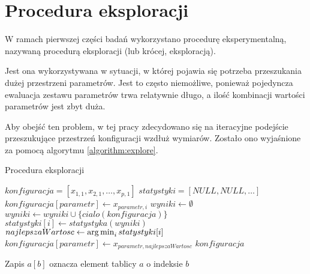 \documentclass[./FM_mgr.tex]{subfiles}
\begin{document}
\section{Procedura eksploracji} \label{appendix:explore}

W ramach pierwszej części badań wykorzystano procedurę eksperymentalną, nazywaną procedurą eksploracji (lub krócej, eksploracją).

Jest ona wykorzystywana w sytuacji, w której pojawia się potrzeba przeszukania dużej przestrzeni parametrów.
Jest to często niemożliwe, ponieważ pojedyncza ewaluacja zestawu parametrów trwa relatywnie długo, a ilość kombinacji wartości parametrów jest zbyt duża.

Aby obejść ten problem, w tej pracy zdecydowano się na iteracyjne podejście przeszukujące przestrzeń konfiguracji wzdłuż wymiarów.
Zostało ono wyjaśnione za pomocą algorytmu \ref{algorithm:explore}.

\clearpage

\begin{algorithm}[H]
	\caption{Procedura eksploracji \label{algorithm:explore}}
	\begin{algorithmic}[1]
		\Start
		\Var $konfiguracja = [x_{1, 1}, x_{2, 1}, \ldots, x_{p, 1}]$
		\Var $statystyki = [NULL, NULL, \ldots]$ 
		\State $konfiguracja[parametr] \gets x_{parametr, i}$ 
		\Var $wyniki \gets \emptyset$
		\State $wyniki \gets wyniki \cup \{ cialo(konfiguracja) \}$
		\EndFor
		\State $statystyki[i] \gets statystyka(wyniki)$
		\EndFor
		\Var $najlepszaWartosc \gets \operatorname*{arg\,min}_{i} statystyki[i]$
		\State $konfiguracja[parametr] \gets x_{parametr, najlepszaWartosc}$
		\EndFor
		\EndFor
		\State \Return $konfiguracja$
		\EndOperator
	\end{algorithmic}
	Zapis $a[b]$ oznacza element tablicy $a$ o indeksie $b$
\end{algorithm}
\end{document}
